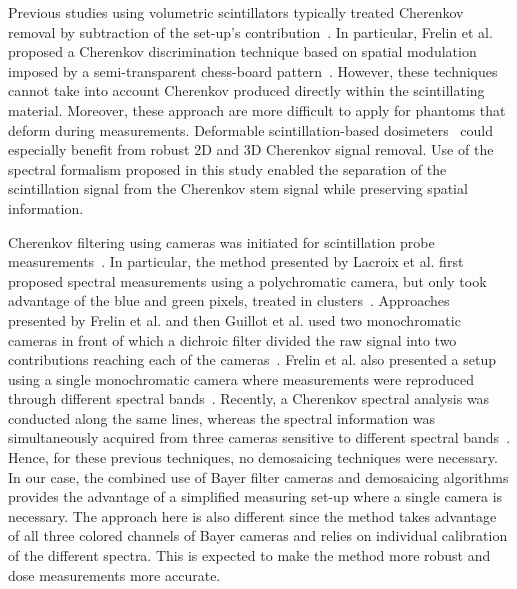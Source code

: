 \documentclass[12pt]{iopart}
\begin{document}
Previous studies using volumetric scintillators typically treated Cherenkov removal by subtraction of the set-up's contribution~\cite{Frelin_dosemap_2008,goulet_novel_2014, rilling_tomographicbased_2020, delage_characterization_2018}. In particular, Frelin et al. proposed a Cherenkov discrimination technique based on spatial modulation imposed by a semi-transparent chess-board pattern~\cite{Frelin_dosemap_2008, dosimap_2009}. However, these techniques cannot take into account Cherenkov produced directly within the scintillating material. Moreover, these approach are more difficult to apply for phantoms that deform during measurements. Deformable scintillation-based dosimeters~\cite{cloutier_deformable_2021_1, cloutier_deformable_2021_2} could especially benefit from robust 2D and 3D Cherenkov signal removal. Use of the spectral formalism proposed in this study enabled the separation of the scintillation signal from the Cherenkov stem signal while preserving spatial information. 

Cherenkov filtering using cameras was initiated for scintillation probe measurements~\cite{Frelin_2005, lacroix_2008_clinical,guillot_spectral_2011,guillot_performance_2013}. In particular, the method presented by Lacroix et al. first proposed spectral measurements using a polychromatic camera, but only took advantage of the blue and green pixels, treated in clusters~\cite{lacroix_2008_clinical}. Approaches presented by Frelin et al. and then Guillot et al. used two monochromatic cameras in front of which a dichroic filter divided the raw signal into two contributions reaching each of the cameras~\cite{Frelin_2005,guillot_spectral_2011, guillot_performance_2013}. Frelin et al. also presented a setup using a single monochromatic camera where measurements were reproduced through different spectral bands~\cite{Frelin_dosemap_2008}. Recently, a Cherenkov spectral analysis was conducted along the same lines, whereas the spectral information was simultaneously acquired from three cameras sensitive to different spectral bands~\cite{alexander_color_2021}. Hence, for these previous techniques, no demosaicing techniques were necessary. In our case, the combined use of Bayer filter cameras and demosaicing algorithms provides the advantage of a simplified measuring set-up where a single camera is necessary. The approach here is also different since the method takes advantage of all three colored channels of Bayer cameras and relies on individual calibration of the different spectra. This is expected to make the method more robust and dose measurements more accurate. 
\end{document}
